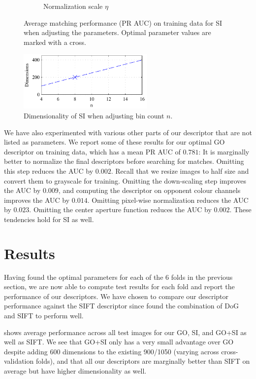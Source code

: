 \documentclass[thesis.tex]{subfiles}
\begin{document}
\begin{figure}[p]
{\begin{subfigure}[t]{0.593\textwidth}
		\caption{Normalization scale $\eta$}
		\label{fig:dtuParametersSi_normSigma}
		\vspace{2mm}
	\end{subfigure}}
	\caption{Average matching performance (PR AUC) on training data for SI when adjusting the parameters. Optimal parameter values are marked with a cross.}
	\label{fig:dtuParametersSiAuc}
	\vspace{1cm}
	\includegraphics[width=0.593\textwidth]{img/dtuParametersSi_binCountDims.pdf}
	\caption{Dimensionality of SI when adjusting bin count $n$.}
	\label{fig:dtuParametersSiDims}
\end{figure}
We have also experimented with various other parts of our descriptor that are not listed as parameters. We report some of these results for our optimal GO descriptor on training data, which has a mean PR AUC of $0.781$: It is marginally better to normalize the final descriptors before searching for matches. Omitting this step reduces the AUC by $0.002$. Recall that we resize images to half size and convert them to grayscale for training. Omitting the down-scaling step improves the AUC by $0.009$, and computing the descriptor on opponent colour channels improves the AUC by $0.014$. Omitting pixel-wise normalization reduces the AUC by $0.023$. Omitting the center aperture function reduces the AUC by $0.002$. These tendencies hold for SI as well.
%
\section{Results}
\label{sec:icResults}
%
Having found the optimal parameters for each of the 6 folds in the previous section, we are now able to compute test results for each fold and report the performance of our descriptors.
We have chosen to compare our descriptor performance against the SIFT descriptor since \citet{dahl2011finding} found the combination of DoG and SIFT to perform well.

 shows average performance across all test images for our GO, SI, and GO+SI as well as SIFT. We see that GO+SI only has a very small advantage over GO despite adding 600 dimensions to the existing 900/1050 (varying across cross-validation folds), and that all our descriptors are marginally better than SIFT on average but have higher dimensionality as well.
\end{document}
